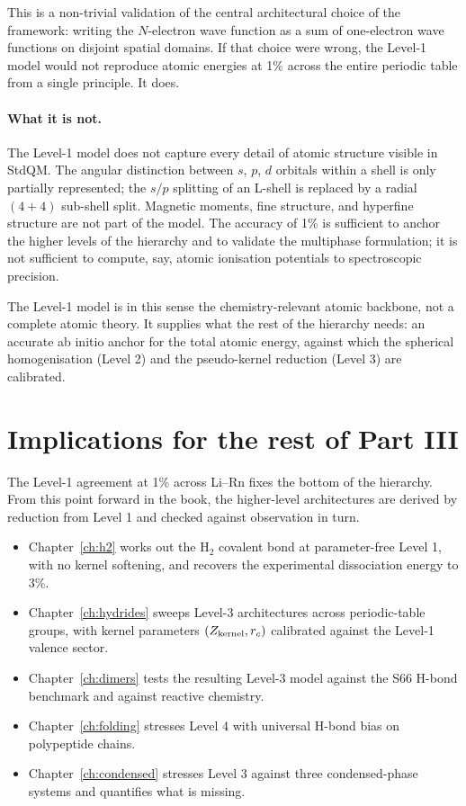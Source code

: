 This is a non-trivial validation of the central architectural choice of the framework: writing the $N$-electron wave function as a sum of one-electron wave functions on disjoint spatial domains. If that choice were wrong, the Level-1 model would not reproduce atomic energies at 1\% across the entire periodic table from a single principle. It does.

\paragraph{What it is not.} The Level-1 model does not capture every detail of atomic structure visible in StdQM. The angular distinction between $s$, $p$, $d$ orbitals within a shell is only partially represented; the $s/p$ splitting of an L-shell is replaced by a radial $(4{+}4)$ sub-shell split. Magnetic moments, fine structure, and hyperfine structure are not part of the model. The accuracy of 1\% is sufficient to anchor the higher levels of the hierarchy and to validate the multiphase formulation; it is not sufficient to compute, say, atomic ionisation potentials to spectroscopic precision.

The Level-1 model is in this sense the chemistry-relevant atomic backbone, not a complete atomic theory. It supplies what the rest of the hierarchy needs: an accurate ab initio anchor for the total atomic energy, against which the spherical homogenisation (Level 2) and the pseudo-kernel reduction (Level 3) are calibrated.

\section{Implications for the rest of Part III}\label{sec:to-part-iii}

The Level-1 agreement at 1\% across Li--Rn fixes the bottom of the hierarchy. From this point forward in the book, the higher-level architectures are derived by reduction from Level 1 and checked against observation in turn.

\begin{itemize}
\item Chapter~\ref{ch:h2} works out the H$_2$ covalent bond at parameter-free Level 1, with no kernel softening, and recovers the experimental dissociation energy to 3\%.
\item Chapter~\ref{ch:hydrides} sweeps Level-3 architectures across periodic-table groups, with kernel parameters $(Z_{\rm kernel}, r_c)$ calibrated against the Level-1 valence sector.
\item Chapter~\ref{ch:dimers} tests the resulting Level-3 model against the S66 H-bond benchmark and against reactive chemistry.
\item Chapter~\ref{ch:folding} stresses Level 4 with universal H-bond bias on polypeptide chains.
\item Chapter~\ref{ch:condensed} stresses Level 3 against three condensed-phase systems and quantifies what is missing.
\end{itemize}

